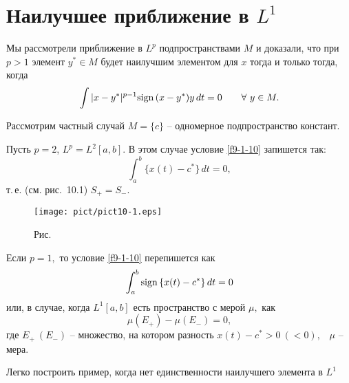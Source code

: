 
\section{Наилучшее приближение в $L^1$}

Мы рассмотрели приближение в {$L^p$ подпространствами $M$} и
 доказали, что при $p>1$ {элемент} $y^*\in M$
 будет наилучшим элементом для $x$ тогда и только тогда, когда
 \begin{equation}\label{f9-1-10}
 \int |x-y^*|^{p-1} {\rm sign \, } (x-y^*)y\, dt=0\qquad \forall\  y\in M.
 \end{equation}

 \begin{Example} %
 Рассмотрим частный случай $M=\{c\}$ --  одномерное подпространство
 констант.

 Пусть $p=2$, {$L^p=L^2[a,b].$} В этом случае условие \eqref{f9-1-10} запишется так:
 $$
 \int_{a}^b\{x(t)-c^*\}\, dt=0,
 $$
 т.\,е. (см. рис.~10.1) $S_+=S_-.$


  \bigskip
\begin{figure}[ht]
\begin{center}
\texttt{[image: pict/pict10-1.eps]}
\end{center}
 \bigskip
 \label{r10-1}

 \centerline{Рис.~\theris}
 \bigskip
\end{figure}



 \noindent Если $p=1,$ то условие \eqref{f9-1-10} перепишется как
 $$
 \int_a^b{\rm sign \, } \{x(t)-c^*\}\, dt=0
 $$
 или, { в случае, когда $L^1[a,b]$ есть пространство с мерой $\mu,$ как}
 \begin{equation}\label{f10-1}
 \mu(E_+)-\mu(E_-)=0,
 \end{equation}
 где $E_+\ (E_-)$ -- множество, на котором разность $x(t)-c^*>0\
 (<0),$~ $\mu$ -- мера.
 \end{Example}

 Легко построить пример, когда нет единственности
 наилучшего элемента в {$L^1$} 


